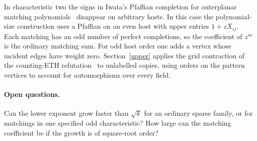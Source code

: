 \documentclass[11pt]{article}
\theoremstyle{remark}
\begin{document}
In characteristic two the signs in Iwata's Pfaffian completion for outerplanar matching polynomials~\cite[Lemmas~2.1--2.2 and Theorem~3.1]{iwata-matching-pfaffian} disappear on arbitrary hosts. In this case the polynomial-size construction uses a Pfaffian on an even host with upper entries $1+zX_{ij}$. Each matching has an odd number of perfect completions, so the coefficient of $z^m$ is the ordinary matching sum. For odd host order one adds a vertex whose incident edges have weight zero. Section~\ref{upper} applies the grid contraction of the counting-ETH refutation~\cite{grid-sat} to unlabelled copies, using orders on the pattern vertices to account for automorphisms over every field.

\paragraph{Open questions.}
Can the lower exponent grow faster than $\sqrt{k}$ for an ordinary sparse family, or for matchings in one specified odd characteristic? How large can the matching coefficient be if the growth is of square-root order?
\end{document}
